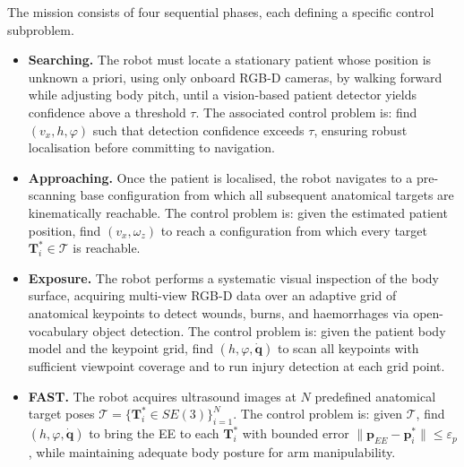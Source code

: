 The mission consists of four sequential phases, each defining a specific control
subproblem.
\begin{itemize}
  \item \textbf{Searching.} The robot must locate a stationary patient whose
        position is unknown a priori, using only onboard RGB-D cameras, by
        walking forward while adjusting body pitch, until a vision-based
        patient detector yields confidence above a threshold $\tau$. The
        associated control problem is: find $(v_x, h, \varphi)$ such that
        detection confidence exceeds $\tau$, ensuring robust localisation before
        committing to navigation.
  \item \textbf{Approaching.} Once the patient is localised, the robot
        navigates to a pre-scanning base configuration from which all subsequent
        anatomical targets are kinematically reachable. The control problem is:
        given the estimated patient position, find $(v_x, \omega_z)$ to reach a
        configuration from which every target $\mathbf{T}_i^* \in \mathcal{T}$
        is reachable.
  \item \textbf{Exposure.} The robot performs a systematic visual inspection
        of the body surface, acquiring multi-view RGB-D data over an
        adaptive grid of anatomical keypoints to detect wounds, burns, and
        haemorrhages via open-vocabulary object detection. The control problem
        is: given the patient body model and the keypoint grid, find
        $(h, \varphi, \dot{\mathbf{q}})$ to scan all keypoints with sufficient
        viewpoint coverage and to run injury detection at each grid point.
  \item \textbf{\acs{FAST}.} The robot acquires ultrasound images at $N$
        predefined anatomical target poses
        $\mathcal{T} = \{\mathbf{T}_i^* \in SE(3)\}_{i=1}^{N}$. The control
        problem is: given $\mathcal{T}$, find $(h, \varphi, \dot{\mathbf{q}})$
        to bring the \ac{EE} to each $\mathbf{T}_i^*$ with bounded error
        $\|\mathbf{p}_{EE} - \mathbf{p}_i^*\| \leq \varepsilon_p$, while
        maintaining adequate body posture for arm manipulability.
\end{itemize}
